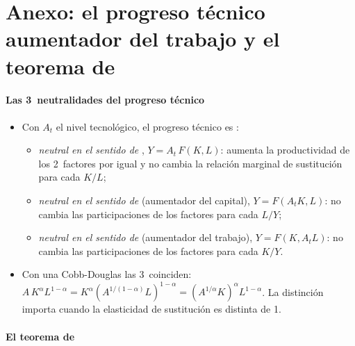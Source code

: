 \documentclass[11pt]{article}
\begin{document}
\section{Anexo: el progreso técnico aumentador del trabajo\cortetitulo{} y el teorema de }\label{anexo:uzawa}

\paragraph{Las 3~neutralidades del progreso técnico}

\begin{itemize}
\item Con $A_t$ el nivel tecnológico, el progreso técnico es\nocite{Acemoglu2009} :
  \begin{itemize}
  \item \emph{neutral en el sentido de }, $Y=A_t\,F(K,L)$: aumenta la productividad de los 2~factores por igual y no cambia la relación marginal de sustitución para cada $K/L$;
  \item \emph{neutral en el sentido de } (aumentador del capital), $Y=F(A_tK,L)$: no cambia las participaciones de los factores para cada $L/Y$;
  \item \emph{neutral en el sentido de } (aumentador del trabajo), $Y=F(K,A_tL)$: no cambia las participaciones de los factores para cada $K/Y$.
  \end{itemize}
\item Con una Cobb-Douglas las 3~coinciden: $A\,K^{\alpha}L^{1-\alpha}=K^{\alpha}(A^{1/(1-\alpha)}L)^{1-\alpha}=(A^{1/\alpha}K)^{\alpha}L^{1-\alpha}$. La distinción importa cuando la elasticidad de sustitución es distinta de 1.
\end{itemize}

\paragraph{El teorema de }
\end{document}

